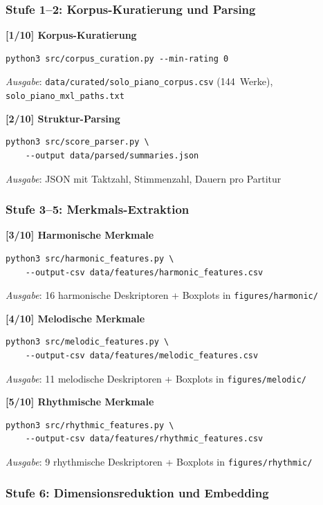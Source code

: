 \documentclass[10pt,a4paper]{article}
\theoremstyle{definition}
\begin{document}
\subsubsection{Stufe 1--2: Korpus-Kuratierung und Parsing}

\textbf{[1/10] Korpus-Kuratierung}
\begin{lstlisting}
python3 src/corpus_curation.py --min-rating 0
\end{lstlisting}
\textit{Ausgabe}: \texttt{data/curated/solo\_piano\_corpus.csv} (144~Werke), \newline\texttt{solo\_piano\_mxl\_paths.txt}

\textbf{[2/10] Struktur-Parsing}
\begin{lstlisting}
python3 src/score_parser.py \
    --output data/parsed/summaries.json
\end{lstlisting}
\textit{Ausgabe}: JSON mit Taktzahl, Stimmenzahl, Dauern pro Partitur

\subsubsection{Stufe 3--5: Merkmals-Extraktion}

\textbf{[3/10] Harmonische Merkmale}
\begin{lstlisting}
python3 src/harmonic_features.py \
    --output-csv data/features/harmonic_features.csv
\end{lstlisting}
\textit{Ausgabe}: 16 harmonische Deskriptoren + Boxplots in \texttt{figures/harmonic/}

\textbf{[4/10] Melodische Merkmale}
\begin{lstlisting}
python3 src/melodic_features.py \
    --output-csv data/features/melodic_features.csv
\end{lstlisting}
\textit{Ausgabe}: 11 melodische Deskriptoren + Boxplots in \texttt{figures/melodic/}

\textbf{[5/10] Rhythmische Merkmale}
\begin{lstlisting}
python3 src/rhythmic_features.py \
    --output-csv data/features/rhythmic_features.csv
\end{lstlisting}
\textit{Ausgabe}: 9 rhythmische Deskriptoren + Boxplots in \texttt{figures/rhythmic/}

\subsubsection{Stufe 6: Dimensionsreduktion und Embedding}
\end{document}

